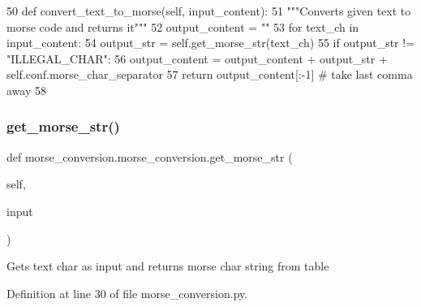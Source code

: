 \begin{DoxyCode}
50     \textcolor{keyword}{def }convert\_text\_to\_morse(self, input\_content):
51         \textcolor{stringliteral}{"""Converts given text to morse code and returns it"""}
52         output\_content = \textcolor{stringliteral}{""}
53         \textcolor{keywordflow}{for} text\_ch \textcolor{keywordflow}{in} input\_content:
54             output\_str = self.get\_morse\_str(text\_ch)
55             \textcolor{keywordflow}{if} output\_str != \textcolor{stringliteral}{"ILLEGAL\_CHAR"}:
56                 output\_content = output\_content + output\_str + self.conf.morse\_char\_separator
57         \textcolor{keywordflow}{return} output\_content[:-1]  \textcolor{comment}{# take last comma away}
58 
\end{DoxyCode}
\mbox{\label{classmorse__conversion_1_1morse__conversion_a47073274e46c3a138d46f0163a413582}} 
\subsubsection{\texorpdfstring{get\+\_\+morse\+\_\+str()}{get\_morse\_str()}}
{\footnotesize\ttfamily def morse\+\_\+conversion.\+morse\+\_\+conversion.\+get\+\_\+morse\+\_\+str (\begin{DoxyParamCaption}\item[{}]{self,  }\item[{}]{input }\end{DoxyParamCaption})}

\begin{DoxyVerb}Gets text char as input and returns morse char string from table\end{DoxyVerb}
 

Definition at line 30 of file morse\+\_\+conversion.\+py.


